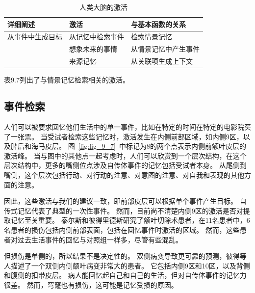 \begin{table}[htbp] 
	\newcommand{\tabincell}[2]{\begin{tabular}{@{}#1@{}}#2\end{tabular}} %
	\centering
	\caption{人类大脑的激活\label{tab:9_7}}
	\renewcommand\arraystretch{1.5}	%
	\begin{tabular}{lll}
		\toprule
		详细阐述 & 激活 & 与基本函数的关系\\
		\midrule
		从事件中生成目标 & 从记忆中检索事件 & 检索情景记忆  \\
		& 想象未来的事情 & 从情景记忆中产生事件 \\
		& 来源记忆 & 从关联项生成上下文 \\
		\bottomrule
		
	\end{tabular}%
\end{table}%


表9.7列出了与情景记忆检索相关的激活。



\subsection{事件检索}
人们可以被要求回忆他们生活中的单一事件，比如在特定的时间在特定的电影院买了一张票。
当受试者检索这些记忆时，激活发生在内侧前部区域，如内侧9区，以及脾后和海马皮层\cite{hassabis2007patients,summerfield2009decision}。
图~\ref{fig:fig_9_7}~中标记为8的两个点表示内侧前额叶皮层的激活峰。
当与图中的其他点一起考虑时，人们可以欣赏到一个层次结构，在这个层次结构中，更多的嘴侧位点涉及自传体事件的记忆包括受试者本身。
从尾侧到嘴侧，这个层次包括行动、对行动的注意、对意图的注意、对自我和表现的其他方面的注意。
\par


因此，这些激活与我们的建议一致，即前部皮层可以根据单个事件产生目标。
自传式记忆代表了典型的一次性事件。
然而，目前尚不清楚内侧9区的激活是否对提取记忆至关重要。
泰尔斯和彼得里德斯\cite{thaiss2008autobiographical}研究了额叶切除术患者，在11名患者中，6名患者的损伤包括内侧前部表面，包括在回忆事件时激活的区域。
然而，这些患者对过去生活事件的回忆与对照组一样多，尽管有些混乱。
\par


但损伤是单侧的，所以结果不是决定性的。
双侧病变导致更可靠的预测，彼得等人\cite{bird2004impact}描述了一个双侧内侧额叶病变非常大的患者。
它包括内侧9区和10区，以及背侧和腹侧的扣带皮层。
病人能回忆起自己和自己的生活，但对自传体事件的记忆力很差。
然而，穹窿也有损伤，这可能是记忆受损的原因。
\par



